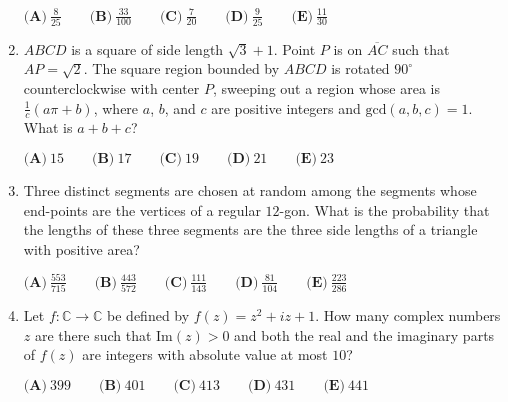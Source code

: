 \documentclass{article}
\begin{document}
\begin{enumerate}[label=\arabic*., itemsep=0.5em]
\( \textbf{(A)} \ \frac{8}{25} \qquad \textbf{(B)} \ \frac{33}{100} \qquad \textbf{(C)} \ \frac{7}{20} \qquad \textbf{(D)} \ \frac{9}{25} \qquad \textbf{(E)} \ \frac{11}{30}\)\par \vspace{0.5em}\item \( ABCD\) is a square of side length \( \sqrt{3} + 1 \). Point \( P \) is on \( \overline{AC} \) such that \( AP = \sqrt{2} \). The square region bounded by \( ABCD \) is rotated \( 90^{\circ} \) counterclockwise with center \( P \), sweeping out a region whose area is \( \frac{1}{c} (a \pi + b) \), where \(a \), \(b\), and \( c \) are positive integers and \( \text{gcd}(a,b,c) = 1 \). What is \( a + b + c \)?

\(\textbf{(A)} \ 15 \qquad \textbf{(B)} \ 17 \qquad \textbf{(C)} \ 19 \qquad \textbf{(D)} \ 21 \qquad \textbf{(E)} \ 23 \)\par \vspace{0.5em}\item Three distinct segments are chosen at random among the segments whose end-points are the vertices of a regular \(12\)-gon. What is the probability that the lengths of these three segments are the three side lengths of a triangle with positive area?

\( \textbf{(A)} \ \frac{553}{715} \qquad \textbf{(B)} \ \frac{443}{572} \qquad \textbf{(C)} \ \frac{111}{143} \qquad \textbf{(D)} \ \frac{81}{104} \qquad \textbf{(E)} \ \frac{223}{286}\)\par \vspace{0.5em}\item Let \(f : \mathbb{C} \to \mathbb{C} \) be defined by \( f(z) = z^2 + iz + 1 \). How many complex numbers \(z \) are there such that \( \text{Im}(z) > 0 \) and both the real and the imaginary parts of \(f(z)\) are integers with absolute value at most \( 10 \)?

\( \textbf{(A)} \ 399 \qquad \textbf{(B)} \ 401 \qquad \textbf{(C)} \ 413 \qquad \textbf{(D)} \ 431 \qquad \textbf{(E)} \ 441 \)\par \vspace{0.5em}\end{enumerate}
\end{document}
